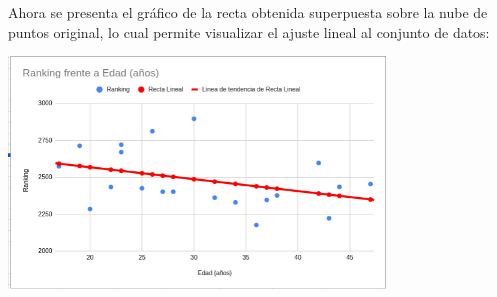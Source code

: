 \documentclass[12pt]{article}
\begin{document}
    \vspace{1cm}
        Ahora se presenta el gráfico de la recta obtenida superpuesta sobre la nube de puntos original, lo cual permite visualizar el ajuste lineal al conjunto de datos:

    \vspace{0.5cm}

    \begin{center}
        \includegraphics[width=0.75\textwidth]{rectaNubeDePuntos.png}
    \end{center}
\end{document}

